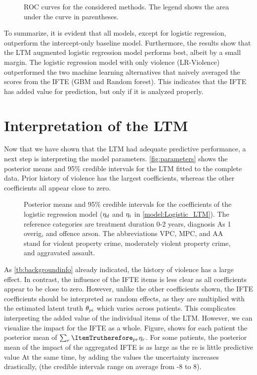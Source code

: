 \documentclass[a4paper,11pt]{article}
\begin{document}
\begin{figure}[!ht]
    \centering
    
    \caption{ROC curves for the considered methods. The legend shows the area under the curve in parentheses.}
    \label{fig:roc_curves}
\end{figure}

To summarize, it is evident that all models, except for logistic regression, outperform the intercept-only baseline model.
Furthermore, the results show that the LTM augmented logistic regression model performs best, albeit by a small margin.
The logistic regression model with only violence (LR-Violence) outperformed the two machine learning alternatives that naively averaged the scores from the IFTE (GBM and Random forest).
This indicates that the IFTE has added value for prediction, but only if it is analyzed properly.

\section{Interpretation of the LTM}
Now that we have shown that the LTM had adequate predictive performance, a next step is interpreting the model parameters.
\autoref{fig:parameters} shows the posterior means and 95\% credible intervals for the LTM fitted to the complete data.
Prior history of violence has the largest coefficients, whereas the other coefficients all appear close to zero.
\begin{figure}[!ht]
    \centering
    
    \caption{Posterior means and 95\% credible intervals for the coefficients of the logistic regression model ($\eta_{d}$ and $\eta_{i}$ in \autoref{model:Logistic_LTM}). The reference categories are treatment duration 0-2 years, diagnosis As 1 overig, and offence arson. The abbreviations VPC, MPC, and AA stand for violent property crime, moderately violent property crime, and aggravated assault.}
    \label{fig:parameters}
\end{figure}
As \autoref{tb:backgroundinfo} already indicated, the history of violence has a large effect.
In contrast, the influence of the IFTE items is less clear as all coefficients appear to be close to zero.
However, unlike the other coefficients shown, the IFTE coefficients should be interpreted as random effects, as they are multiplied with the estimated latent truth $\theta_{pi}$ which varies across patients.
This complicates interpreting the added value of the individual items of the LTM. 
However, we can visualize the impact for the IFTE as a whole. %
Figure, shows for each patient the posterior mean of $\sum_{\Irater}\ItemTrutherefore_{\Ipatient\Irater}\CovariateBeta_{\Irater}$.
For some patients, the posterior mean of the impact of the aggregated IFTE is as large as the re is little predictive value
At the same time, by adding the values the uncertainty increases drastically, (the credible intervals range on average from -8 to 8).
\end{document}
